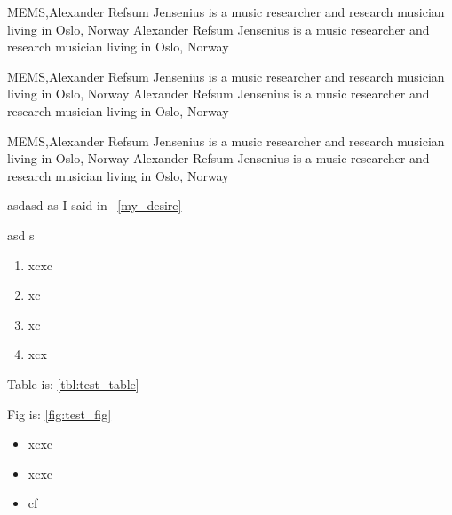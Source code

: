 MEMS,Alexander Refsum Jensenius is a music researcher and research musician living in Oslo, Norway Alexander Refsum Jensenius is a music researcher and research musician living in Oslo, Norway

MEMS,Alexander Refsum Jensenius is a music researcher and research musician living in Oslo, Norway Alexander Refsum Jensenius is a music researcher and research musician living in Oslo, Norway

MEMS,Alexander Refsum Jensenius is a music researcher and research musician living in Oslo, Norway Alexander Refsum Jensenius is a music researcher and research musician living in Oslo, Norway

asdasd as I said in ~\ref{my_desire}

asd
s

\begin{enumerate}
\item xcxc
\item xc
\item xc
\item xcx
\end{enumerate}

Table is:
\ref{tbl:test_table}

Fig is:
\ref{fig:test_fig}

\begin{itemize}
\item xcxc
\item xcxc
\item cf
\end{itemize}

